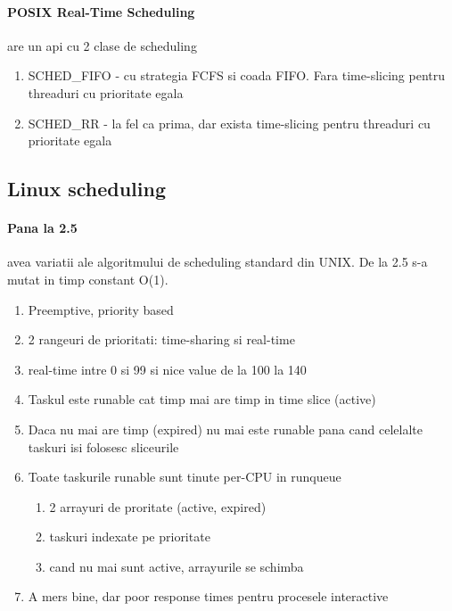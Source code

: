 \documentclass{article}
\begin{document}
\paragraph*{POSIX Real-Time Scheduling} are un api cu 2 clase de scheduling
\begin{enumerate}
    \item SCHED\_FIFO - cu strategia FCFS si coada FIFO. Fara time-slicing pentru threaduri cu prioritate egala
    \item SCHED\_RR - la fel ca prima, dar exista time-slicing pentru threaduri cu prioritate egala
\end{enumerate}


\subsection*{Linux scheduling}
\paragraph*{Pana la 2.5} avea variatii ale algoritmului de scheduling standard din UNIX. De la 2.5 s-a mutat in timp constant O(1).
\begin{enumerate}
    \item Preemptive, priority based
    \item 2 rangeuri de prioritati: time-sharing si real-time
    \item real-time intre 0 si 99 si nice value de la 100 la 140
    \item Taskul este runable cat timp mai are timp in time slice (active)
    \item Daca nu mai are timp (expired) nu mai este runable pana cand celelalte taskuri isi folosesc sliceurile
    \item Toate taskurile runable sunt tinute per-CPU in runqueue
          \begin{enumerate}
              \item 2 arrayuri de proritate (active, expired)
              \item taskuri indexate pe prioritate
              \item cand nu mai sunt active, arrayurile se schimba
          \end{enumerate}
    \item A mers bine, dar poor response times pentru procesele interactive
\end{enumerate}
\end{document}
